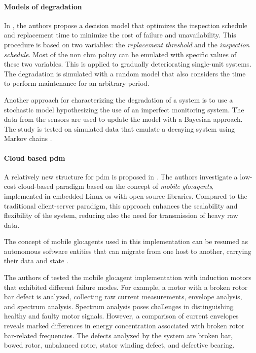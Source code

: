 \paragraph{Models of degradation}
In \cite{Pred_Maint_Tech_Grall}, the authors propose a decision model that optimizes the inspection schedule and replacement time to minimize the cost of failure and unavailability. This procedure is based on two variables: the \emph{replacement threshold} and the \emph{inspection schedule}. Most of the non \gls{cbm} policy can be emulated with specific values of these two variables. This is applied to gradually deteriorating single-unit systems. The degradation is simulated with a random model that also considers the time to perform maintenance for an arbitrary period.

Another approach for characterizing the degradation of a system is to use a stochastic model hypothesizing the use of an imperfect monitoring system. The data from the sensors are used to update the model with a Bayesian approach. The study is tested on simulated data that emulate a decaying system using Markov chains \cite{CURCURU2010989}\cite{GALANTE19981361}.

\paragraph{Cloud based \gls{pdm}}
A relatively new structure for \gls{pdm} is proposed in \cite{CloudBased_Wang}. The authors investigate a low-cost cloud-based paradigm based on the concept of \emph{mobile \gls{glo:agent}s}, implemented in embedded Linux \gls{os} with open-source libraries. Compared to the traditional client-server paradigm, this approach enhances the scalability and flexibility of the system, reducing also the need for transmission of heavy raw data.

The concept of mobile \gls{glo:agent}s used in this implementation can be resumed as autonomous software entities that can migrate from one host to another, carrying their data and state \cite{CUCURULL2009712}.

The authors of \cite{CloudBased_Wang} tested the mobile \gls{glo:agent} implementation with induction motors that exhibited different failure modes. For example, a motor with a broken rotor bar defect is analyzed, collecting raw current measurements, envelope analysis, and spectrum analysis. Spectrum analysis poses challenges in distinguishing healthy and faulty motor signals. However, a comparison of current envelopes reveals marked differences in energy concentration associated with broken rotor bar-related frequencies. The defects analyzed by the system are broken bar, bowed rotor, unbalanced rotor, stator winding defect, and defective bearing.

